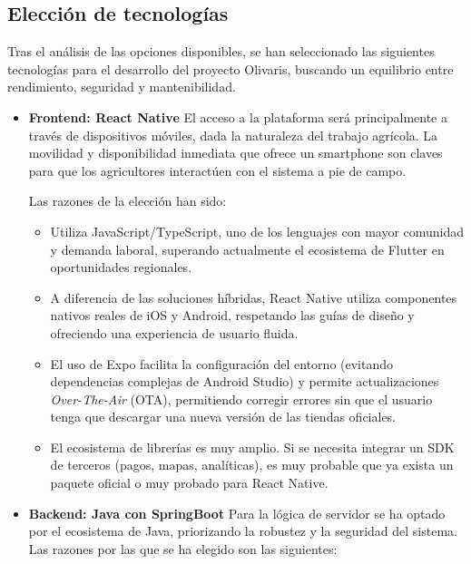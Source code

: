 \subsection{Elección de tecnologías}

Tras el análisis de las opciones disponibles, se han seleccionado las siguientes tecnologías para el desarrollo del proyecto Olivaris, 
buscando un equilibrio entre rendimiento, seguridad y mantenibilidad.

\begin{itemize}
    \item \textbf{Frontend: React Native}
    \newline
    El acceso a la plataforma será principalmente a través de dispositivos móviles, dada la naturaleza del trabajo agrícola. La movilidad 
    y disponibilidad inmediata que ofrece un smartphone son claves para que los agricultores interactúen con el sistema a pie de campo.

    Las razones de la elección han sido:

    \begin{itemize}
        \item Utiliza JavaScript/TypeScript, uno de los lenguajes con mayor comunidad y demanda laboral, superando actualmente el ecosistema 
        de Flutter en oportunidades regionales.
        \item A diferencia de las soluciones híbridas, React Native utiliza componentes nativos reales de iOS y Android, respetando las guías 
        de diseño y ofreciendo una experiencia de usuario fluida.
        \item El uso de Expo facilita la configuración del entorno (evitando dependencias complejas de Android Studio) y permite actualizaciones 
        \textit{Over-The-Air} (OTA), permitiendo corregir errores sin que el usuario tenga que descargar una nueva versión de las tiendas oficiales.
        \item El ecosistema de librerías es muy amplio. Si se necesita integrar un SDK de terceros (pagos, mapas, analíticas), es muy probable que ya exista
        un paquete oficial o muy probado para React Native.
    \end{itemize}

    \item \textbf{Backend: Java con SpringBoot}
    \newline
    Para la lógica de servidor se ha optado por el ecosistema de Java, priorizando la robustez y la seguridad del sistema. Las razones por las que se ha elegido
    son las siguientes:


\end{itemize}
